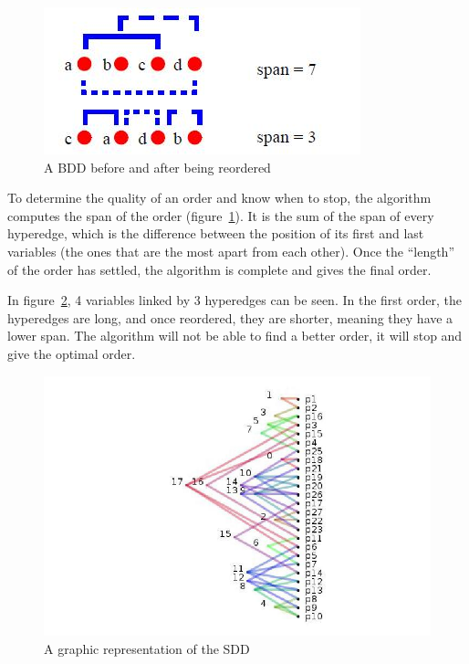 \documentclass[12pt]{report}
\begin{document}
\begin{figure}[!h]
  \centering
  \includegraphics[scale=0.7]{force_span.jpg}
  \caption{A BDD before and after being reordered}
  \label{force_span}
\end{figure}

To determine the quality of an order and know when to stop, the algorithm computes the span of the order (figure~\ref{force_span}). It is the sum of the span of every hyperedge, which is the difference between the position of its first and last variables (the ones that are the most apart from each other). Once the \enquote{length} of the order has settled, the algorithm is complete and gives the final order.

In figure~\ref{order_graph}, 4 variables linked by 3 hyperedges can be seen. In the first order, the hyperedges are long, and once reordered, they are shorter, meaning they have a lower span. The algorithm will not be able to find a better order, it will stop and give the optimal order.

\begin{figure}[!h]
  \centering
  \includegraphics[scale=0.5]{representation_order.jpg}
  \caption{A graphic representation of the SDD}
  \label{order_graph}
\end{figure}
\end{document}
